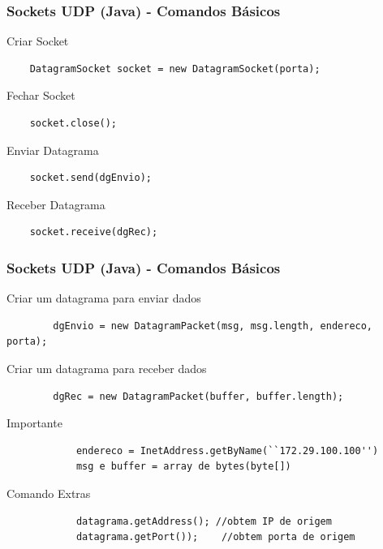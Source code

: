 \documentclass[hyperref={pdfpagelabels=false},table]{beamer}
\begin{document}
\begin{frame}[fragile]
\frametitle{Sockets UDP (Java) - Comandos Básicos}

Criar Socket
\begin{lstlisting}
    DatagramSocket socket = new DatagramSocket(porta);
\end{lstlisting} 

Fechar Socket
\begin{lstlisting}
    socket.close();
\end{lstlisting} 

Enviar Datagrama
\begin{lstlisting}
    socket.send(dgEnvio);
\end{lstlisting} 

Receber Datagrama
\begin{lstlisting}
    socket.receive(dgRec);
\end{lstlisting} 
\end{frame}

\begin{frame}[fragile]
	\frametitle{Sockets UDP (Java) - Comandos Básicos}

	Criar um datagrama para enviar dados
	\begin{lstlisting}
    	dgEnvio = new DatagramPacket(msg, msg.length, endereco, porta);
	\end{lstlisting} 

	Criar um datagrama para receber dados
	\begin{lstlisting}
		dgRec = new DatagramPacket(buffer, buffer.length);
	\end{lstlisting} 

	\alert{Importante}
		\begin{lstlisting}
			endereco = InetAddress.getByName(``172.29.100.100'')
			msg e buffer = array de bytes(byte[])
		\end{lstlisting} 

	\alert{Comando Extras}
		\begin{lstlisting}
			datagrama.getAddress();	//obtem IP de origem
			datagrama.getPort());    //obtem porta de origem
		\end{lstlisting} 

\end{frame}
\end{document}

